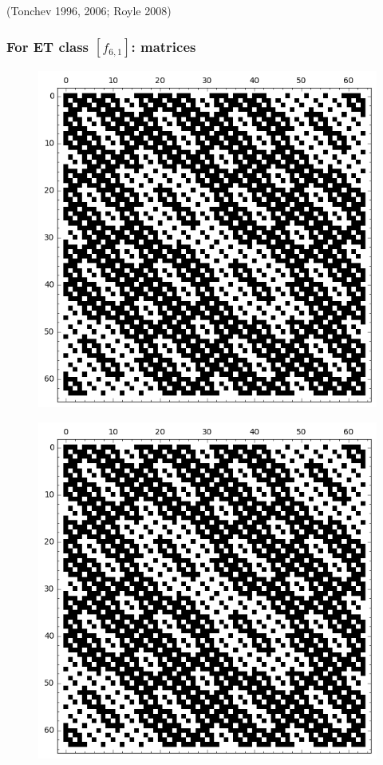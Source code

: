 \documentclass[pdf,sprung,slideColor,nocolorBG]{beamer}
\newenvironment{colortheme}[1]{
\def\ProvidesPackageRCS $##1${\relax}
\renewcommand{\ProcessOptions}{\relax}
\makeatletter

\makeatother
}{}
\newcommand{\slidecite}[1]{\tiny{(#1)}\normalsize{}}
\begin{document}
\begin{colortheme}{jubata}
\begin{frame}
\slidecite{Tonchev 1996, 2006; Royle 2008}
 \end{frame}
\begin{frame}
\frametitle{For ET class $[f_{6,1}]$: matrices}
\begin{figure}
\centering
\begin{minipage}{.48\textwidth}
  \centering
  \includegraphics[width=.9\linewidth]{../matrix_plot/c6_1_weight_class_matrix.png}
  \label{fig:6_1_weight_class_matrix}
\end{minipage}%
\begin{minipage}{.48\textwidth}
  \centering
  \includegraphics[width=.9\linewidth]{../matrix_plot/c6_1_bent_cayley_graph_index_matrix.png}

\end{minipage}
\end{figure}
\end{frame}
\end{colortheme}
\end{document}
